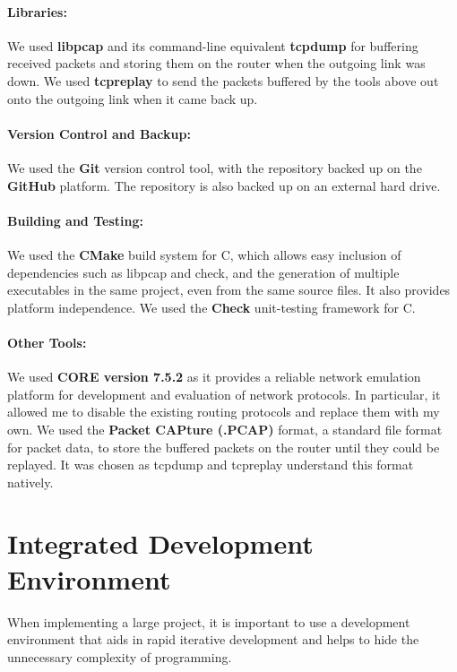 \documentclass[withindex,glossary,openany]{cam-thesis}
\begin{document}
\paragraph{Libraries:}

We used \textbf{libpcap} and its command-line equivalent \textbf{tcpdump} for buffering received packets and storing them on the router when the outgoing link was down. We used \textbf{tcpreplay} to send the packets buffered by the tools above out onto the outgoing link when it came back up.

\paragraph{Version Control and Backup:}

We used the \textbf{Git} version control tool, with the repository backed up on the \textbf{GitHub} platform. The repository is also backed up on an external hard drive.


\paragraph{Building and Testing:}

We used the \textbf{CMake} build system for C, which allows easy inclusion of dependencies such as libpcap and check, and the generation of multiple executables in the same project, even from the same source files. It also provides platform independence. We used the \textbf{Check} unit-testing framework for C.


\paragraph{Other Tools:}

We used \textbf{CORE version 7.5.2} as it provides a reliable network emulation platform for development and evaluation of network protocols. In particular, it allowed me to disable the existing routing protocols and replace them with my own. We used the \textbf{Packet CAPture (.PCAP)} format, a standard file format for packet data, to store the buffered packets on the router until they could be replayed. It was chosen as tcpdump and tcpreplay understand this format natively.

\section{Integrated Development Environment}

When implementing a large project, it is important to use a development environment that aids in rapid iterative development and helps to hide the unnecessary complexity of programming.
\end{document}
